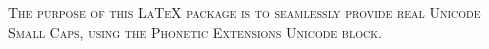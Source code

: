 \documentclass{article}
\begin{document}
\noindent\textsc{The purpose of this LaTeX package is to seamlessly provide real Unicode Small Caps, using the Phonetic Extensions Unicode block.}\newline
\par
\noindent{}
\end{document}

